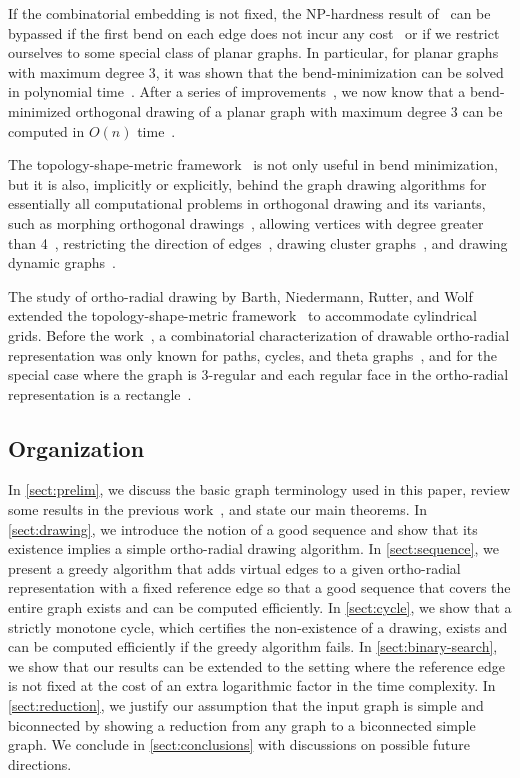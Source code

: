 \documentclass{theoretics}
\begin{document}
If the combinatorial embedding is not fixed, the NP-hardness result of~\cite{formann1993drawing,GT96} can be bypassed if the first bend on each edge does not incur any cost~\cite{BRW12} or if we restrict ourselves to some special class of planar graphs. In particular, for planar graphs with maximum degree 3, it was shown that the bend-minimization can be solved in polynomial time~\cite{BLV98}. After a series of improvements~\cite{chang2017bend,didimo2020optimal,didimo2018bend}, we now know that a bend-minimized orthogonal drawing of a planar graph with maximum degree $3$ can be computed in $O(n)$ time~\cite{didimo2020optimal}.

The topology-shape-metric framework~\cite{tamassia1987embedding} is not only useful in bend minimization, but it is also, implicitly or explicitly, behind the graph drawing algorithms for essentially all computational problems in orthogonal drawing and its variants, such as morphing orthogonal drawings~\cite{biedl2013morphing},  allowing vertices with degree greater than 4~\cite{BDPP99,KM98,papakostas2000efficient},  restricting the direction of edges~\cite{didimo2014complexity,durocher2014drawing}, drawing cluster graphs~\cite{brandes2004draw}, and drawing dynamic graphs~\cite{brandes1998dynamic}.

The study of ortho-radial drawing by Barth, Niedermann, Rutter, and Wolf~\cite{barth2023topology} extended the topology-shape-metric framework~\cite{tamassia1987embedding} to accommodate cylindrical grids. Before the work~\cite{barth2023topology}, a combinatorial characterization of drawable ortho-radial representation was only known for paths, cycles, and theta graphs~\cite{hasheminezhad2009ortho}, and for the special case where the graph is 3-regular and each regular face in the ortho-radial representation is a rectangle~\cite{hasheminezhad2010rectangular}.

\subsection{Organization}

In \cref{sect:prelim}, we discuss the basic graph terminology used in this paper, review some results in the previous work~\cite{barth2023topology}, and state our main theorems. In \cref{sect:drawing}, we introduce the notion of a good sequence and  show that its existence implies a simple  ortho-radial drawing algorithm. In \cref{sect:sequence}, we present a greedy algorithm that adds virtual edges to a given ortho-radial representation with a fixed reference edge so that a good sequence that covers the entire graph exists and can be computed efficiently. In \cref{sect:cycle}, we show that a strictly monotone cycle, which certifies the non-existence of a drawing, exists and can be computed efficiently if the greedy algorithm fails. In \cref{sect:binary-search}, we show that our results can be extended to the setting where the reference edge is not fixed at the cost of an extra logarithmic factor in the time complexity.
In \cref{sect:reduction}, we justify our assumption that the input graph is simple and  biconnected by showing a reduction from any graph to a  biconnected simple graph. We conclude in \cref{sect:conclusions} with discussions on possible future directions.
\end{document}
